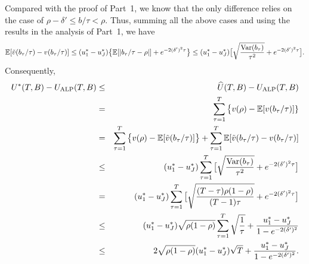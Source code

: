 Compared with the proof of Part~1, we know that the only difference relies on the case of $\rho - \delta' \leq b/\tau <\rho$. Thus, summing all the above cases and using the results in the analysis of Part~1, we have
\begin{eqnarray}
\mathbb{E}[\tilde{v}(b_\tau/\tau) - v(b_{\tau}/\tau)] \leq (u_1^* - u_J^*)\big\{\mathbb{E}[|b_{\tau}/\tau - \rho|] + e^{-2(\delta')^2\tau}\big\} \leq  (u_1^* - u_J^*)\big[\sqrt{\frac{{\rm Var}(b_{\tau})}{\tau^2}} + e^{-2(\delta')^2\tau}\big] . \nonumber
\end{eqnarray}
Consequently,
\begin{eqnarray}
 U^*(T,B) -  U_{\rm ALP}(T,B) &\leq & \widehat{U}(T,B) -  U_{\rm ALP}(T,B) \nonumber \\
&=&  \sum_{\tau = 1}^T \big\{v(\rho)-\mathbb{E}[v(b_\tau/\tau)]\} \nonumber \\
&=& \sum_{\tau = 1}^T \big\{v(\rho)- \mathbb{E}[\tilde{v}(b_\tau/\tau)] \big\} + \sum_{\tau = 1}^T  \mathbb{E}[ \tilde{v}(b_\tau/\tau) - v(b_{\tau}/\tau) ]  \nonumber\\
&\leq& (u_1^* - u_J^*)\sum_{\tau = 1}^T\big[\sqrt{\frac{{\rm Var}(b_{\tau})}{\tau^2}} + e^{-2(\delta')^2\tau}\big] \nonumber\\
& = &(u_1^* - u_J^*)\sum_{\tau = 1}^T\big[\sqrt{\frac{(T-\tau)\rho(1-\rho)}{(T-1)\tau}}+ e^{-2(\delta')^2\tau}\big]  \nonumber\\
& \leq &(u_1^* - u_J^*) \sqrt{\rho(1-\rho)} \sum_{\tau = 1}^T\sqrt{\frac{1}{\tau}}  + \frac{u_1^* - u_J^*}{1-  e^{-2(\delta')^2}}\nonumber\\
&\leq &2\sqrt{\rho(1-\rho)} (u_1^* - u_J^*) \sqrt{T} + \frac{u_1^* - u_J^*}{1- e^{-2(\delta')^2}}. \nonumber
\end{eqnarray}
